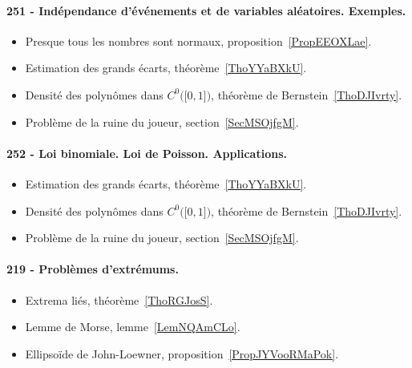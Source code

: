 \paragraph{251 - Indépendance d’événements et de variables aléatoires. Exemples.}
\begin{itemize}
    \item Presque tous les nombres sont normaux, proposition~\ref{PropEEOXLae}.
    \item Estimation des grands écarts, théorème~\ref{ThoYYaBXkU}.
    \item Densité des polynômes dans \( C^0\big( \mathopen[ 0 , 1 \mathclose] \big)\), théorème de Bernstein~\ref{ThoDJIvrty}.
    \item Problème de la ruine du joueur, section~\ref{SecMSOjfgM}.
\end{itemize}
\paragraph{252 - Loi binomiale. Loi de Poisson. Applications.}
\begin{itemize}
    \item Estimation des grands écarts, théorème~\ref{ThoYYaBXkU}.
    \item Densité des polynômes dans \( C^0\big( \mathopen[ 0 , 1 \mathclose] \big)\), théorème de Bernstein~\ref{ThoDJIvrty}.
    \item Problème de la ruine du joueur, section~\ref{SecMSOjfgM}.
\end{itemize}
\paragraph{219 - Problèmes d'extrémums.}
\begin{itemize}
    \item Extrema liés, théorème~\ref{ThoRGJosS}.
    \item Lemme de Morse, lemme~\ref{LemNQAmCLo}.
    \item Ellipsoïde de John-Loewner, proposition~\ref{PropJYVooRMaPok}.
\end{itemize}
